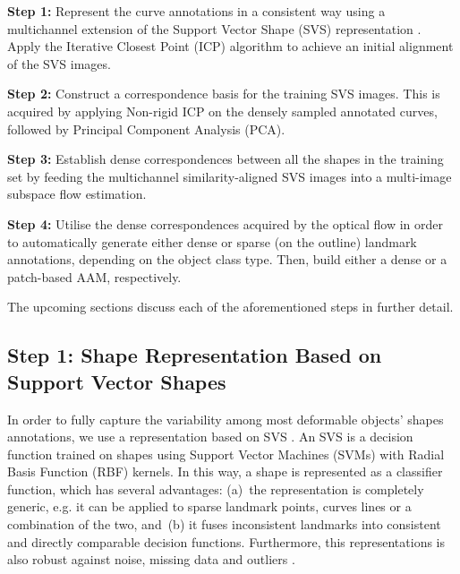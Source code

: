 \noindent\textbf{Step 1:} Represent the curve annotations in a consistent way using a multichannel extension of the Support Vector Shape (SVS) representation \cite{Nguyen2013}. Apply the Iterative Closest Point (ICP) algorithm \cite{Besl1992} to achieve an initial alignment of the SVS images.

\noindent\textbf{Step 2:} Construct a correspondence basis for the training SVS images. This is acquired by applying Non-rigid ICP on the densely sampled annotated curves, followed by Principal Component Analysis (PCA).

\noindent\textbf{Step 3:} Establish dense correspondences between all the shapes in the training set by feeding the multichannel similarity-aligned SVS images into a multi-image subspace flow estimation.

\noindent\textbf{Step 4:} Utilise the dense correspondences acquired by the optical flow in order to automatically generate either dense or sparse (on the outline) landmark annotations, depending on the object class type. Then, build either a dense \cite{ramnath2008increasing, Amberg2009, anderson2014using} or a patch-based \cite{Tzimiropoulos2014} AAM, respectively.

The upcoming sections discuss each of the aforementioned steps in further detail.

{\label{sec:step1}\subsection*{Step 1: Shape Representation Based on Support Vector Shapes}}

In order to fully capture the variability among most deformable objects' shapes annotations, we use a representation based on SVS \cite{Nguyen2013}. An SVS is a decision function trained on shapes using Support Vector Machines (SVMs) with Radial Basis Function (RBF) kernels. In this way, a shape is represented as a classifier function, which has several advantages: (a)~the representation is completely generic, e.g. it can be applied to sparse landmark points, curves lines or a combination of the two, and~(b) it fuses inconsistent landmarks into consistent and directly comparable decision functions. Furthermore, this representations is also robust against noise, missing data and outliers \cite{Nguyen2013}.

